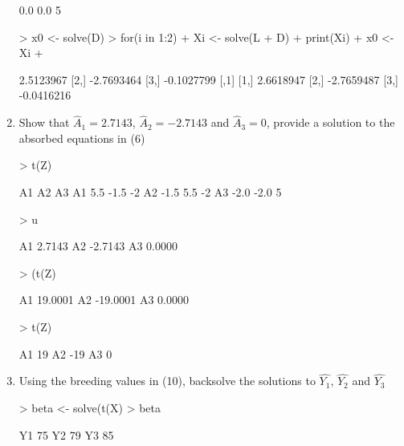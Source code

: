 \documentclass[12pt,a4paper]{paper}
\begin{document}
\begin{enumerate}
\begin{Schunk}
\begin{Soutput}
[3,]  0.0  0.0    5
\end{Soutput}
\begin{Sinput}
> x0 <- solve(D) %*% b
> for(i in 1:2){
+   Xi <- solve(L + D) %*% (b - t(L) %*% x0)
+   print(Xi)
+   x0 <- Xi
+ }
\end{Sinput}
\begin{Soutput}
           [,1]
[1,]  2.5123967
[2,] -2.7693464
[3,] -0.1027799
           [,1]
[1,]  2.6618947
[2,] -2.7659487
[3,] -0.0416216
\end{Soutput}
\end{Schunk}
\item Show that $\hat{A}_{1} = 2.7143$, $\hat{A}_{2} = -2.7143$ and $\hat{A}_{3} = 0$, provide a solution to the absorbed equations in (6)
\begin{Schunk}
\begin{Sinput}
> t(Z) %*% M %*% Z + (Ainv * lambda)
\end{Sinput}
\begin{Soutput}
     A1   A2 A3
A1  5.5 -1.5 -2
A2 -1.5  5.5 -2
A3 -2.0 -2.0  5
\end{Soutput}
\begin{Sinput}
> u
\end{Sinput}
\begin{Soutput}
      [,1]
A1  2.7143
A2 -2.7143
A3  0.0000
\end{Soutput}
\begin{Sinput}
> (t(Z) %*% M %*% Z + (Ainv * lambda)) %*% u
\end{Sinput}
\begin{Soutput}
       [,1]
A1  19.0001
A2 -19.0001
A3   0.0000
\end{Soutput}
\begin{Sinput}
> t(Z) %*% M %*% y
\end{Sinput}
\begin{Soutput}
   [,1]
A1   19
A2  -19
A3    0
\end{Soutput}
\end{Schunk}
\item Using the breeding values in (10), backsolve the solutions to $\hat{Y_{1}}$, $\hat{Y_{2}}$ and $\hat{Y_{3}}$
\begin{Schunk}
\begin{Sinput}
> beta <- solve(t(X) %*% X) %*% t(X)%*%(y - Z %*% u)
> beta
\end{Sinput}
\begin{Soutput}
   [,1]
Y1   75
Y2   79
Y3   85
\end{Soutput}
\end{Schunk}

\end{enumerate}
\end{document}
